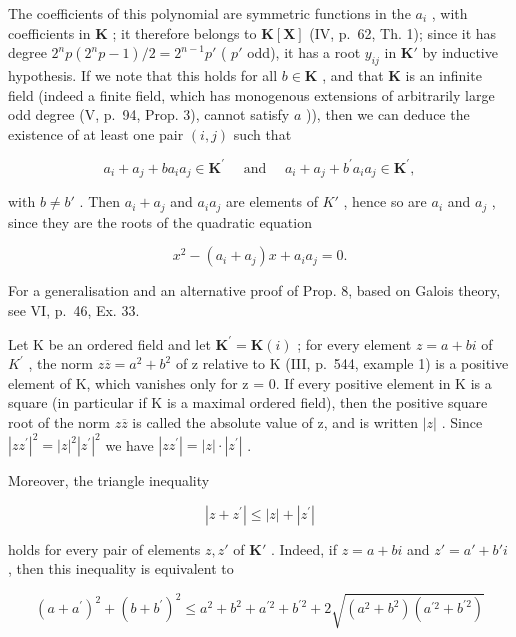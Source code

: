 The coefficients of this polynomial are symmetric functions in the \(a_i\) , with coefficients in \(\mathbf{K}\) ; it therefore belongs to \(\mathbf{K}[\mathbf{X}]\) (IV, p.~62, Th. 1); since it has degree \(2^n p(2^n p - 1)/2 = 2^{n-1}p'\) ( \(p'\) odd), it has a root \(y_{ij}\) in \(\mathbf{K}'\) by inductive hypothesis. If we note that this holds for all \(b \in \mathbf{K}\) , and that \(\mathbf{K}\) is an infinite field (indeed a finite field, which has monogenous extensions of arbitrarily large odd degree (V, p.~94, Prop. 3), cannot satisfy \(a\) )), then we can deduce the existence of at least one pair \((i,j)\) such that

\[
a _ {i} + a _ {j} + b a _ {i} a _ {j} \in \mathbf {K} ^ {\prime} \quad \text { and } \quad a _ {i} + a _ {j} + b ^ {\prime} a _ {i} a _ {j} \in \mathbf {K} ^ {\prime},
\]

with \(b \neq b'\) . Then \(a_i + a_j\) and \(a_i a_j\) are elements of \(K'\) , hence so are \(a_i\) and \(a_j\) , since they are the roots of the quadratic equation

\[
x ^ {2} - \left(a _ {i} + a _ {j}\right) x + a _ {i} a _ {j} = 0.\tag{Q.E.D.}
\]

For a generalisation and an alternative proof of Prop. 8, based on Galois theory, see VI, p.~46, Ex. 33.

Let K be an ordered field and let \(\mathbf{K}^{\prime} = \mathbf{K}(i)\) ; for every element \(z = a + bi\) of \(K^{\prime}\) , the norm \(z\overline{z} = a^{2} + b^{2}\) of z relative to K (III, p.~544, example 1) is a positive element of K, which vanishes only for z = 0. If every positive element in K is a square (in particular if K is a maximal ordered field), then the positive square root of the norm \(z\overline{z}\) is called the absolute value of z, and is written \(|z|\) . Since \(|zz^{\prime}|^{2} = |z|^{2} |z^{\prime}|^{2}\) we have \(|zz^{\prime}| = |z| \cdot |z^{\prime}|\) .

Moreover, the triangle inequality

\[
\left| z + z ^ {\prime} \right| \leqslant \left| z \right| + \left| z ^ {\prime} \right|
\]

holds for every pair of elements \(z, z'\) of \(\mathbf{K}'\) . Indeed, if \(z = a + bi\) and \(z' = a' + b'i\) , then this inequality is equivalent to

\[
(a + a ^ {\prime}) ^ {2} + (b + b ^ {\prime}) ^ {2} \leqslant a ^ {2} + b ^ {2} + a ^ {\prime 2} + b ^ {\prime 2} + 2 \sqrt {(a ^ {2} + b ^ {2}) (a ^ {\prime 2} + b ^ {\prime 2})}
\]

